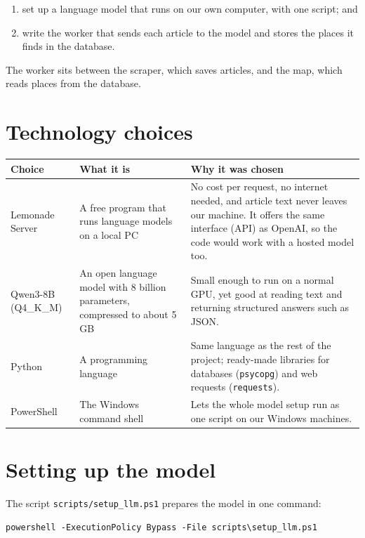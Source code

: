 \documentclass[11pt,a4paper]{article}
\begin{document}
\begin{enumerate}
  \item set up a language model that runs on our own computer, with one script; and
  \item write the worker that sends each article to the model and stores the places it finds in the database.
\end{enumerate}

The worker sits between the scraper, which saves articles, and the map, which
reads places from the database.

\section{Technology choices}

\begin{center}
\begin{tabular}{|p{3cm}|p{4cm}|p{7cm}|}
\hline
\textbf{Choice} & \textbf{What it is} & \textbf{Why it was chosen} \\
\hline
Lemonade Server & A free program that runs language models on a local PC & No cost per request, no internet needed, and article text never leaves our machine. It offers the same interface (API) as OpenAI, so the code would work with a hosted model too. \\
\hline
Qwen3-8B (Q4\_K\_M) & An open language model with 8 billion parameters, compressed to about 5\,GB & Small enough to run on a normal GPU, yet good at reading text and returning structured answers such as JSON. \\
\hline
Python & A programming language & Same language as the rest of the project; ready-made libraries for databases (\texttt{psycopg}) and web requests (\texttt{requests}). \\
\hline
PowerShell & The Windows command shell & Lets the whole model setup run as one script on our Windows machines. \\
\hline
\end{tabular}
\end{center}

\section{Setting up the model}

The script \texttt{scripts/setup\_llm.ps1} prepares the model in one command:

\begin{verbatim}
powershell -ExecutionPolicy Bypass -File scripts\setup_llm.ps1
\end{verbatim}
\end{document}

